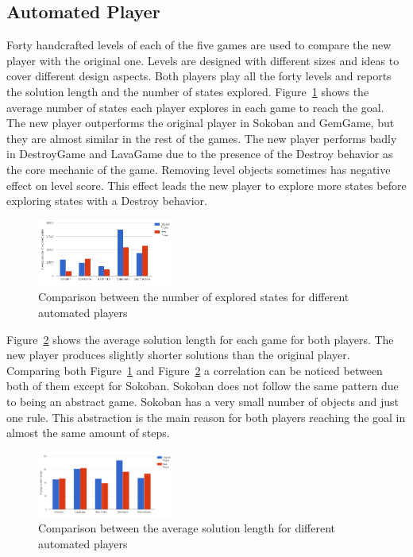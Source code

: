 \documentclass[letterpaper]{article}
\newcommand{\figref}[1]{Figure~\ref{Figure:#1}}
\begin{document}
\subsection{Automated Player}
Forty handcrafted levels of each of the five games are used to compare the new player with the original one. Levels are designed with different sizes and ideas to cover different design aspects. Both players play all the forty levels and reports the solution length and the number of states explored. \figref{automatedPlayerPerformance} shows the average number of states each player explores in each game to reach the goal. The new player outperforms the original player in Sokoban and GemGame, but they are almost similar in the rest of the games. The new player performs badly in DestroyGame and LavaGame due to the presence of the Destroy behavior as the core mechanic of the game. Removing level objects sometimes has negative effect on level score. This effect leads the new player to explore more states before exploring states with a Destroy behavior.\\\par

\begin{figure}[ht]
  	\centering
    \includegraphics[width=0.4\textwidth]{Images/automatedPlayerPerformance}
    \caption{Comparison between the number of explored states for different automated players}
    \label{Figure:automatedPlayerPerformance}
\end{figure}

\figref{automatedPlayerLength} shows the average solution length for each game for both players. The new player produces slightly shorter solutions than the original player. Comparing both \figref{automatedPlayerPerformance} and \figref{automatedPlayerLength} a correlation can be noticed between both of them except for Sokoban. Sokoban does not follow the same pattern due to being an abstract game. Sokoban has a very small number of objects and just one rule. This abstraction is the main reason for both players reaching the goal in almost the same amount of steps.

\begin{figure}[ht]
  	\centering
    \includegraphics[width=0.4\textwidth]{Images/automatedPlayerLength}
    \caption{Comparison between the average solution length for different automated players}
    \label{Figure:automatedPlayerLength}
\end{figure}
\end{document}
